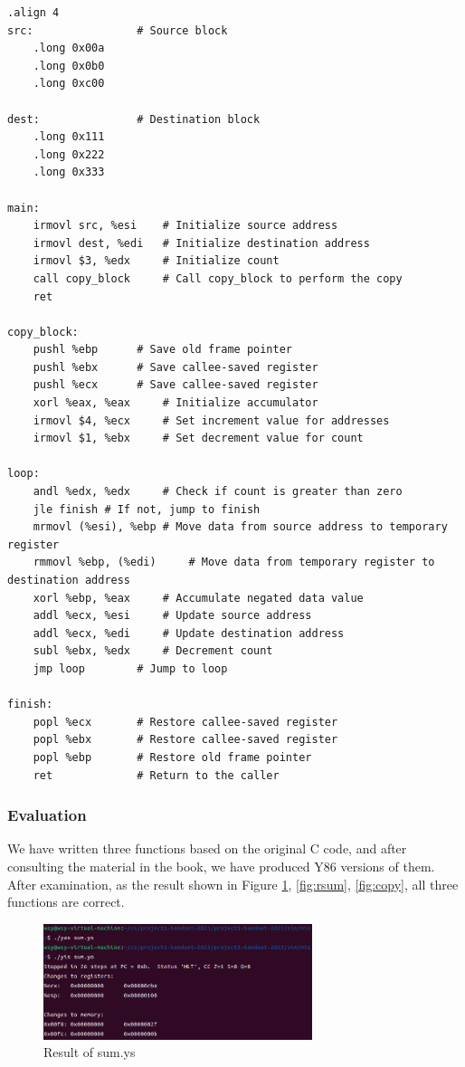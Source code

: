 \documentclass{article}
\begin{document}
\begin{lstlisting}[caption={Core Code of copy.ys}, label={cd:copy}]
.align 4 
src: 				# Source block 
	.long 0x00a 
	.long 0x0b0 
	.long 0xc00 

dest: 				# Destination block 
	.long 0x111 
	.long 0x222 
	.long 0x333 

main: 
	irmovl src, %esi 	# Initialize source address 
	irmovl dest, %edi 	# Initialize destination address 
	irmovl $3, %edx 	# Initialize count 
	call copy_block 	# Call copy_block to perform the copy 
	ret 
	
copy_block: 
	pushl %ebp 		# Save old frame pointer 
	pushl %ebx 		# Save callee-saved register 
	pushl %ecx 		# Save callee-saved register 
	xorl %eax, %eax 	# Initialize accumulator 
	irmovl $4, %ecx 	# Set increment value for addresses 
	irmovl $1, %ebx 	# Set decrement value for count 

loop: 
	andl %edx, %edx 	# Check if count is greater than zero 
	jle finish # If not, jump to finish 
	mrmovl (%esi), %ebp	# Move data from source address to temporary register 
	rmmovl %ebp, (%edi) 	# Move data from temporary register to destination address 
	xorl %ebp, %eax 	# Accumulate negated data value 
	addl %ecx, %esi 	# Update source address 
	addl %ecx, %edi 	# Update destination address 
	subl %ebx, %edx 	# Decrement count 
	jmp loop 		# Jump to loop 
	
finish: 
	popl %ecx 		# Restore callee-saved register 
	popl %ebx 		# Restore callee-saved register 
	popl %ebp 		# Restore old frame pointer 
	ret 			# Return to the caller 
\end{lstlisting}

\subsubsection{Evaluation}


We have written three functions based on the original C code, and after consulting the material in the book, we have produced Y86 versions of them. After examination, as the result shown in Figure \ref{fig:sum}, \ref{fig:rsum}, \ref{fig:copy}, all three functions are correct.

\begin{figure}[htbp]
\centering
\includegraphics[width=0.7\textwidth]{figure/ptasum.png}
\caption{Result of sum.ys} %
\label{fig:sum} %
\end{figure}
\end{document}
